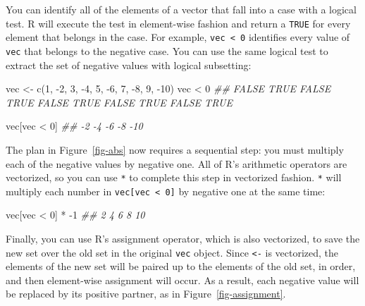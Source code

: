 \documentclass[
  letterpaper,
  DIV=11,
  numbers=noendperiod]{scrbook}
\newenvironment{Shaded}{\begin{snugshade}}{\end{snugshade}}
\newcommand{\DecValTok}[1]{\textcolor[rgb]{0.68,0.00,0.00}{#1}}
\newcommand{\DocumentationTok}[1]{\textcolor[rgb]{0.37,0.37,0.37}{\textit{#1}}}
\newcommand{\FunctionTok}[1]{\textcolor[rgb]{0.28,0.35,0.67}{#1}}
\newcommand{\NormalTok}[1]{\textcolor[rgb]{0.00,0.23,0.31}{#1}}
\newcommand{\OtherTok}[1]{\textcolor[rgb]{0.00,0.23,0.31}{#1}}
\newcommand{\SpecialCharTok}[1]{\textcolor[rgb]{0.37,0.37,0.37}{#1}}
\begin{document}
You can identify all of the elements of a vector that fall into a case
with a logical test. R will execute the test in element-wise fashion and
return a \texttt{TRUE} for every element that belongs in the case. For
example, \texttt{vec\ \textless{}\ 0} identifies every value of
\texttt{vec} that belongs to the negative case. You can use the same
logical test to extract the set of negative values with logical
subsetting:

\begin{Shaded}
\begin{Highlighting}[]
\NormalTok{vec }\OtherTok{\textless{}{-}} \FunctionTok{c}\NormalTok{(}\DecValTok{1}\NormalTok{, }\SpecialCharTok{{-}}\DecValTok{2}\NormalTok{, }\DecValTok{3}\NormalTok{, }\SpecialCharTok{{-}}\DecValTok{4}\NormalTok{, }\DecValTok{5}\NormalTok{, }\SpecialCharTok{{-}}\DecValTok{6}\NormalTok{, }\DecValTok{7}\NormalTok{, }\SpecialCharTok{{-}}\DecValTok{8}\NormalTok{, }\DecValTok{9}\NormalTok{, }\SpecialCharTok{{-}}\DecValTok{10}\NormalTok{)}
\NormalTok{vec }\SpecialCharTok{\textless{}} \DecValTok{0}
\DocumentationTok{\#\# FALSE TRUE FALSE TRUE FALSE TRUE FALSE TRUE FALSE TRUE}

\NormalTok{vec[vec }\SpecialCharTok{\textless{}} \DecValTok{0}\NormalTok{]}
\DocumentationTok{\#\# {-}2  {-}4  {-}6  {-}8 {-}10}
\end{Highlighting}
\end{Shaded}

The plan in Figure~\ref{fig-abs} now requires a sequential step: you
must multiply each of the negative values by negative one. All of R's
arithmetic operators are vectorized, so you can use \texttt{*} to
complete this step in vectorized fashion. \texttt{*} will multiply each
number in \texttt{vec{[}vec\ \textless{}\ 0{]}} by negative one at the
same time:

\begin{Shaded}
\begin{Highlighting}[]
\NormalTok{vec[vec }\SpecialCharTok{\textless{}} \DecValTok{0}\NormalTok{] }\SpecialCharTok{*} \SpecialCharTok{{-}}\DecValTok{1}
\DocumentationTok{\#\# 2  4  6  8 10}
\end{Highlighting}
\end{Shaded}

Finally, you can use R's assignment operator, which is also vectorized,
to save the new set over the old set in the original \texttt{vec}
object. Since \texttt{\textless{}-} is vectorized, the elements of the
new set will be paired up to the elements of the old set, in order, and
then element-wise assignment will occur. As a result, each negative
value will be replaced by its positive partner, as in
Figure~\ref{fig-assignment}.
\end{document}
